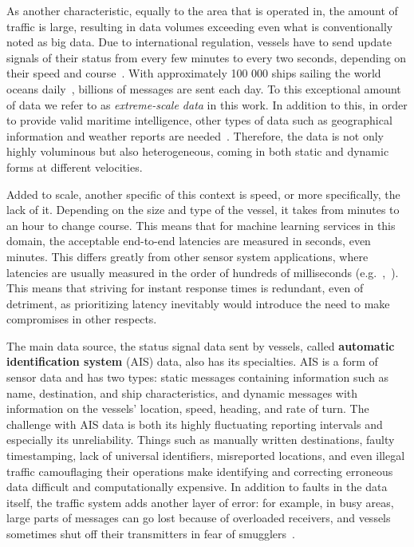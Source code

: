 As another characteristic, equally to the area that is operated in, the amount of traffic is large, resulting in data volumes exceeding even what is conventionally noted as big data. Due to international regulation, vessels have to send update signals of their status from every few minutes to every two seconds, depending on their speed and course~\cite{maritimeinformatics}. With approximately 100 000 ships sailing the world oceans daily~\cite{maritimeinformatics}, billions of messages are sent each day. To this exceptional amount of data we refer to as \textit{extreme-scale data} in this work. In addition to this, in order to provide valid maritime intelligence, other types of data such as geographical information and weather reports are needed~\cite{D1.1}. Therefore, the data is not only highly voluminous but also heterogeneous, coming in both static and dynamic forms at different velocities.

Added to scale, another specific of this context is speed, or more specifically, the lack of it. Depending on the size and type of the vessel, it takes from minutes to an hour to change course. This means that for machine learning services in this domain, the acceptable end-to-end latencies are measured in seconds, even minutes. This differs greatly from other sensor system applications, where latencies are usually measured in the order of hundreds of milliseconds (e.g.~\cite{facebook},~\cite{edgelatency}). This means that striving for instant response times is redundant, even of detriment, as prioritizing latency inevitably would introduce the need to make compromises in other respects.
\enlargethispage{7mm}

The main data source, the status signal data sent by vessels, called \textbf{automatic identification system} (AIS) data, also has its specialties. AIS is a form of sensor data and has two types: static messages containing information such as name, destination, and ship characteristics, and dynamic messages with information on the vessels' location, speed, heading, and rate of turn. The challenge with AIS data is both its highly fluctuating reporting intervals and especially its unreliability.  Things such as manually written destinations, faulty timestamping, lack of universal identifiers, misreported locations, and even illegal traffic camouflaging their operations make identifying and correcting erroneous data difficult and computationally expensive. In addition to faults in the data itself, the traffic system adds another layer of error: for example, in busy areas, large parts of messages can go lost because of overloaded receivers, and vessels sometimes shut off their transmitters in fear of smugglers~\cite{maritimeinformatics}.

